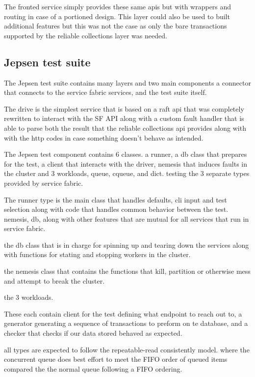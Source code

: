 \documentclass[a4paper,10pt,titlepage]{report}
\begin{document}
The fronted service simply provides these same apis but with wrappers and routing in case of a portioned design. This layer could also be used to built additional features but this was not the case as only the bare transactions supported by the reliable collections layer was needed.

\subsection{Jepsen test suite}
The Jepsen test suite contains many layers and two main components a connector that connects to the service fabric services, and the test suite itself.

The drive is the simplest service that is based on a raft api that was completely rewritten to interact with the SF API along with a custom fault handler that is able to parse both the result that the reliable collections api provides along with with the http codes in case something doesn't behave as intended.

The Jepsen test component contains 6 classes. a runner, a db class that prepares for the test, a client that interacts with the driver, nemesis that induces faults in the cluster and 3 workloads, queue, cqueue, and dict. testing the 3 separate types provided by service fabric.

The runner type is the main class that handles defaults, cli input and test selection along with code that handles common behavior between the test. nemesis, db, along with other features that are mutual for all services that run in service fabric.

the db class that is in charge for spinning up and tearing down the services along with functions for stating and stopping workers in the cluster.

the nemesis class that contains the functions that kill, partition or otherwise mess and attempt to break the cluster.

the 3 workloads.

These each contain client for the test defining what endpoint to reach out to, a generator generating a sequence of transactions to preform on te database, and a checker that checks if our data stored behaved as expected.

all types are expected to follow the repeatable-read consistently model. where the concurrent queue does best effort to meet the FIFO order of queued items compared the the normal queue following a FIFO ordering.
\end{document}
